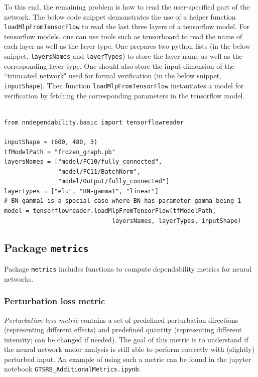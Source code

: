 \documentclass{article}
\begin{document}
To this end, the remaining problem is how to read the user-specified part of the network. The below code snippet demonstrates the use of a helper function \texttt{loadMlpFromTensorFlow} to read the last three layers of a tensorflow model. For tensorflow models, one can use tools such as tensorboard to read the name of each layer as well as the layer type. One prepares two python lists (in the below snippet, \texttt{layersNames} and \texttt{layerTypes}) to store the layer name as well as the corresponding layer type. One should also store the input dimension of the ``truncated network" used for formal verification (in the below snippet, \texttt{inputShape}). Then function \texttt{loadMlpFromTensorFlow} instantiates a model for verification by fetching the corresponding parameters in the tensorflow model. 

\begin{small}
\color{blue}
\begin{verbatim}

from nndependability.basic import tensorflowreader

inputShape = (600, 480, 3)
tfModelPath = "frozen_graph.pb"
layersNames = ["model/FC10/fully_connected", 
               "model/FC11/BatchNorm", 
               "model/Output/fully_connected"]
layerTypes = ["elu", "BN-gamma1", "linear"]
# BN-gamma1 is a special case where BN has parameter gamma being 1
model = tensorflowreader.loadMlpFromTensorFlow(tfModelPath, 
                              layersNames, layerTypes, inputShape)
\end{verbatim}
\end{small}



\subsection{Package \texttt{metrics}}

Package \texttt{metrics} includes functions to compute dependability metrics for neural networks. 


\subsubsection{Perturbation loss metric}

\emph{Perturbation loss metric} contains a set of predefined perturbation directions (representing different effects) and predefined quantity (representing different intensity; can be changed if needed). The goal of this metric is to understand if the neural network under analysis is still able to perform correctly with (slightly) perturbed input. An example of using such a metric can be found in the jupyter notebook \texttt{GTSRB\_AdditionalMetrics.ipynb}.   
\end{document}
